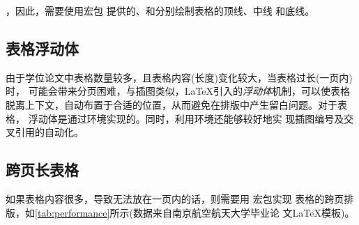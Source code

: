 ，因此，需要使用宏包
提供的、和分别绘制表格的顶线、中线
和底线。

\subsection{表格浮动体}

由于学位论文中表格数量较多，且表格内容(长度)变化较大，当表格过长(一页内)时，
可能会带来分页困难，与插图类似，\LaTeX{}引入的\emph{浮动体}机制，可以使表格
脱离上下文，自动布置于合适的位置，从而避免在排版中产生留白问题。对于表格，
浮动体是通过环境实现的。同时，利用环境还能够较好地实
现插图编号及交叉引用的自动化。

\subsection{跨页长表格}

如果表格内容很多，导致无法放在一页内的话，则需要用 宏包实现
表格的跨页排版，如\ref{tab:performance}所示(数据来自南京航空航天大学毕业论
文\LaTeX{}模板)。

\def\tabcaption{实验数据}
\def\tabheadrow{
  \multirow{2}{*}{测试程序} & \multicolumn{1}{c}{正常运行} &
   \multicolumn{1}{c}{同步} & \multicolumn{1}{c}{检查点} &
   \multicolumn{1}{c}{卷回恢复} & \multicolumn{1}{c}{进程迁移} &
   \multicolumn{1}{c}{检查点} \\
   & \multicolumn{1}{c}{时间(s)} & \multicolumn{1}{c}{时间(s)} &
   \multicolumn{1}{c}{时间(s)} & \multicolumn{1}{c}{时间(s)} &
   \multicolumn{1}{c}{时间(s)} & \multicolumn{1}{c}{文件(KB)} \\
 }

\def\ctntabcap{
   \caption* {表~\thetable\hskip1em 实验数据（续）}\\
   \addlinespace[-3.0ex]
 }
\def\ctntabcmd{
   \ctntabcap\\
   \toprule
   \tabheadrow
   \midrule
   \endhead
   \midrule
   \multicolumn{7}{r}{\small 接下页}\\
   \endfoot
   \endlastfoot
 }

